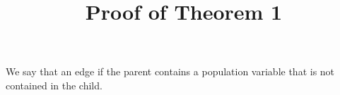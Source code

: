 \documentclass[letterpaper]{article}
\begin{document}
\title{Proof of Theorem 1}

\author{
}

\maketitle

%




%
%


%
%




We say that an edge  if the parent contains a population variable that is not contained in the child.
\end{document}
